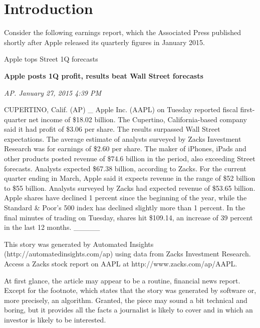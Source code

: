 \documentclass[notoc, symmetric, nobib, nols]{towcenter-book}
\begin{document}
\chapter{Introduction}

Consider the following earnings report, which the Associated Press published shortly after Apple released its quarterly figures in January 2015.

\begin{framed}
Apple tops Street 1Q forecasts

\textbf{Apple posts 1Q profit, results beat Wall Street forecasts}

\textit{AP. January 27, 2015 4:39 PM}

CUPERTINO, Calif. (AP) _ Apple Inc. (AAPL) on Tuesday reported fiscal first-quarter net income of \$18.02 billion. The Cupertino, California-based company said it had profit of \$3.06 per share. The results surpassed Wall Street expectations. The average estimate of analysts surveyed by Zacks Investment Research was for earnings of \$2.60 per share. The maker of iPhones, iPads and other products posted revenue of \$74.6 billion in the period, also exceeding Street forecasts. Analysts expected \$67.38 billion, according to Zacks. For the current quarter ending in March, Apple said it expects revenue in the range of \$52 billion to \$55 billion. Analysts surveyed by Zacks had expected revenue of \$53.65 billion. Apple shares have declined 1 percent since the beginning of the year, while the Standard & Poor's 500 index has declined slightly more than 1 percent. In the final minutes of trading on Tuesday, shares hit \$109.14, an increase of 39 percent in the last 12 months.
_____

This story was generated by Automated Insights (http://automatedinsights.com/ap) using data from Zacks Investment Research. Access a Zacks stock report on AAPL at http://www.zacks.com/ap/AAPL.
\end{framed}

At first glance, the article may appear to be a routine, financial news report. Except for the footnote, which states that the story was generated by software or, more precisely, an algorithm. Granted, the piece may sound a bit technical and boring, but it provides all the facts a journalist is likely to cover and in which an investor is likely to be interested. 
\end{document}
